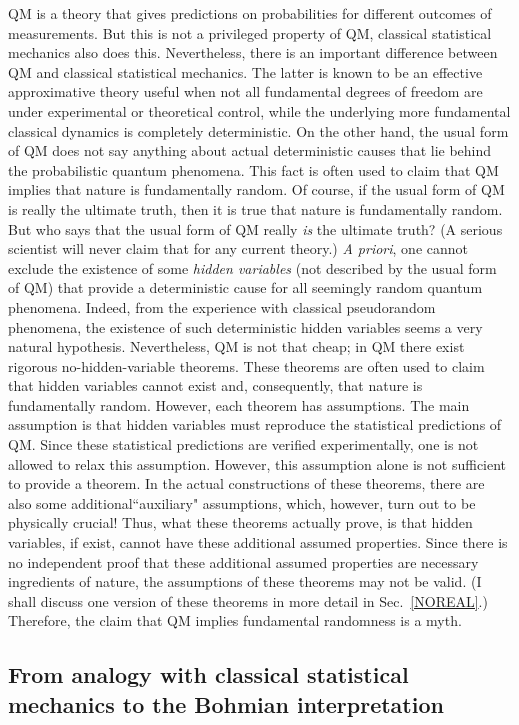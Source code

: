 \documentclass[12pt]{article}
\begin{document}
QM is a theory that gives predictions on probabilities
for different outcomes of measurements. But this is not a 
privileged property of QM, classical statistical mechanics also does this.
Nevertheless, there is an important difference between QM and 
classical statistical mechanics. The latter is known to be an effective
approximative theory useful when not all fundamental
degrees of freedom are under experimental or theoretical control, 
while the underlying more fundamental classical dynamics
is completely deterministic. On the other hand, the usual form
of QM does not say anything about actual deterministic causes  
that lie behind the probabilistic quantum phenomena. 
This fact is often used to claim that QM implies that nature 
is fundamentally random. Of course, if the usual form of 
QM is really the ultimate truth, then it is true that nature 
is fundamentally random. But who says that the usual form of QM really 
{\em is} the ultimate truth? (A serious scientist will never 
claim that for any current theory.) {\it A priori}, one cannot exclude
the existence of some {\em hidden variables} (not described by the 
usual form of QM) that provide a deterministic cause for all 
seemingly random quantum phenomena. Indeed, from the experience 
with classical pseudorandom phenomena, the existence of such 
deterministic hidden variables seems a very natural hypothesis.
Nevertheless, QM is not that cheap; in QM there exist 
rigorous no-hidden-variable theorems. These theorems are often 
used to claim that hidden variables cannot exist and, consequently, 
that nature is fundamentally random. However, each theorem has 
assumptions. The main assumption is that hidden 
variables must reproduce the statistical predictions of QM.
Since these statistical predictions are verified experimentally, 
one is not allowed to relax this assumption. However, this assumption 
alone is not sufficient to provide a theorem. In the actual constructions
of these theorems, there are also some 
additional``auxiliary" assumptions, which, 
however, turn out to be physically crucial! Thus,
what these theorems actually prove, is that hidden variables, if exist, 
cannot have these additional assumed properties.
Since there is no independent proof that these additional 
assumed properties are necessary ingredients of nature, 
the assumptions of these theorems may not be valid.
(I shall discuss one version of these theorems in more detail in 
Sec.~\ref{NOREAL}.)
Therefore, the claim that QM implies fundamental randomness is 
a myth. 

\subsection{From analogy with classical statistical mechanics
to the Bohmian interpretation}
\end{document}
